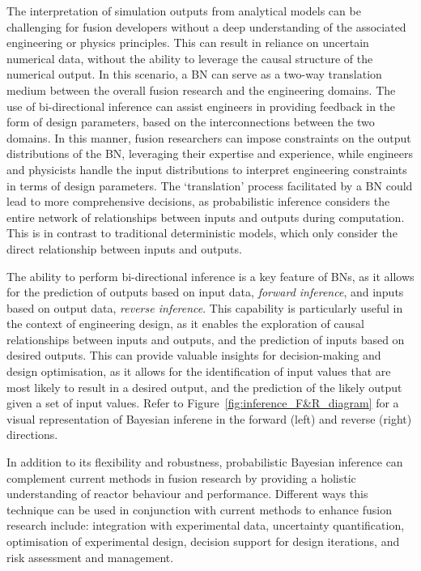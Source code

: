 \documentclass[journal]{IEEEtran}
\begin{document}
The interpretation of simulation outputs from analytical models can be challenging for fusion developers without a deep understanding of the associated engineering or physics principles. This can result in reliance on uncertain numerical data, without the ability to leverage the causal structure of the numerical output. In this scenario, a BN can serve as a two-way translation medium between the overall fusion research and the engineering domains. The use of bi-directional inference can assist engineers in providing feedback in the form of design parameters, based on the interconnections between the two domains. In this manner, fusion researchers can impose constraints on the output distributions of the BN, leveraging their expertise and experience, while engineers and physicists handle the input distributions to interpret engineering constraints in terms of design parameters. The `translation' process facilitated by a BN could lead to more comprehensive decisions, as probabilistic inference considers the entire network of relationships between inputs and outputs during computation. This is in contrast to traditional deterministic models, which only consider the direct relationship between inputs and outputs. 

The ability to perform bi-directional inference is a key feature of BNs, as it allows for the prediction of outputs based on input data, \textit{forward inference}, and inputs based on output data, \textit{reverse inference}. This capability is particularly useful in the context of engineering design, as it enables the exploration of causal relationships between inputs and outputs, and the prediction of inputs based on desired outputs. This can provide valuable insights for decision-making and design optimisation, as it allows for the identification of input values that are most likely to result in a desired output, and the prediction of the likely output given a set of input values. Refer to Figure~\ref{fig:inference_F&R_diagram} for a visual representation of Bayesian inferene in the forward (left) and reverse (right) directions. 

In addition to its flexibility and robustness, probabilistic Bayesian inference can complement current methods in fusion research by providing a holistic understanding of reactor behaviour and performance. Different ways this technique can be used in conjunction with current methods to enhance fusion research include: integration with experimental data, uncertainty quantification, optimisation of experimental design, decision support for design iterations, and risk assessment and management.
    
\end{document}
